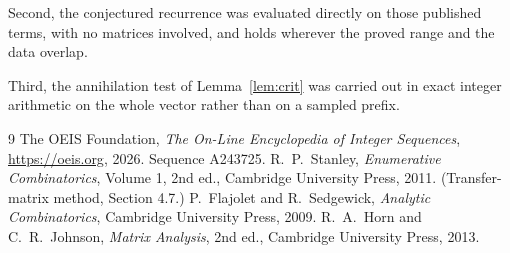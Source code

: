 \documentclass[11pt,a4paper]{article}
\theoremstyle{plain}
\theoremstyle{definition}
\begin{document}
Second, the conjectured recurrence was evaluated directly on those published terms, with no
matrices involved, and holds wherever the proved range and the data overlap.

Third, the annihilation test of Lemma~\ref{lem:crit} was carried out in exact integer
arithmetic on the whole vector rather than on a sampled prefix.

\begin{thebibliography}{9}
 The OEIS Foundation, \emph{The On-Line Encyclopedia of Integer
Sequences}, \url{https://oeis.org}, 2026. Sequence A243725.
 R.~P.~Stanley, \emph{Enumerative Combinatorics}, Volume 1, 2nd ed.,
Cambridge University Press, 2011. (Transfer-matrix method, Section 4.7.)
 P.~Flajolet and R.~Sedgewick, \emph{Analytic Combinatorics}, Cambridge
University Press, 2009.
 R.~A.~Horn and C.~R.~Johnson, \emph{Matrix Analysis}, 2nd ed., Cambridge
University Press, 2013.
\end{thebibliography}
\end{document}
